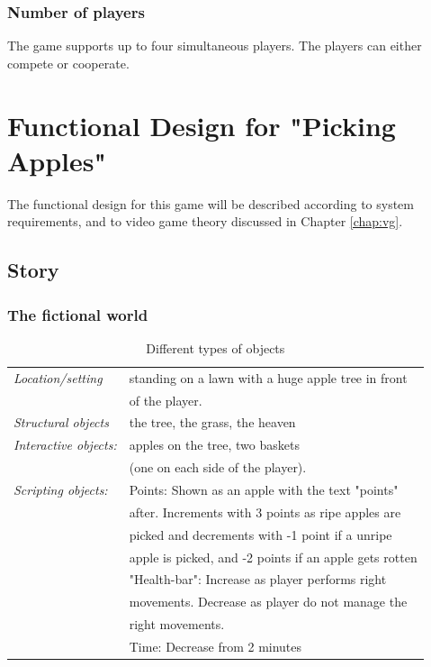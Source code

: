 \subsubsection{Number of players}
The game supports up to four simultaneous players. The players can either compete or cooperate.

\section{Functional Design for "Picking Apples"}
\label{sec:funcdesignapple}
The functional design for this game will be described according to system requirements, and to video game theory discussed in Chapter \ref{chap:vg}.

\subsection{Story}

\subsubsection{The fictional world} 

\begin{table} [H]
\centering
    \begin{tabular}{|l|l|}
       \hline
        \emph{Location/setting} & standing on a lawn with a huge apple tree in front \\ & of the player. \\ \hline
       \emph{Structural objects} & the tree, the grass, the heaven  \\ \hline
       \emph{Interactive objects:} & apples on the tree, two baskets \\ & (one on each side of the player). \\ \hline
	   \emph{Scripting objects:} &  Points: Shown as an apple with the text "points" \\ & after. Increments with 3 points as ripe apples are \\ & picked and decrements with -1 point if a unripe \\ & apple is picked, and -2 points if an apple gets rotten \\ \cline{2-2}
	   & "Health-bar": Increase as player performs right  \\ & movements. Decrease as player do not manage the \\ & right  movements.  \\ \cline{2-2}
	   & Time: Decrease from 2 minutes \\ \hline
    \end{tabular}
    \caption[Different types of objects in the "Apple Picking" game]{Different types of objects}
    \label{tab:objects2}
\end{table}  

